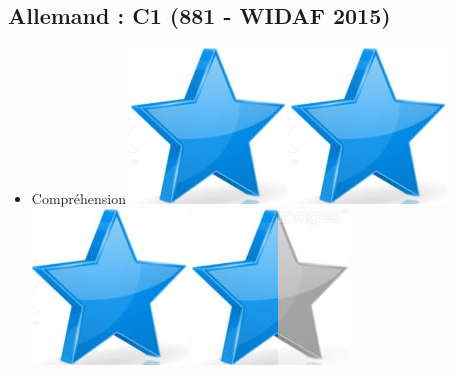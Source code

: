 \documentclass[10pt,a4paper,sans]{article}
\begin{document}
\begin{minipage}[t]{0.28\textwidth}
\begin{mdframed}[style=cadreCompetences]
        \subsection{Allemand : C1 \newline (881 - WIDAF 2015)}
            \begin{itemize}
                \item{Compréhension
                    \hfill
                    \includegraphics[scale=0.25]{img/star.png} \hspace{-0.22cm}
                    \includegraphics[scale=0.25]{img/star.png} \hspace{-0.22cm}
                    \includegraphics[scale=0.25]{img/star.png} \hspace{-0.22cm}
                    \includegraphics[scale=0.25]{img/half_star.png} \hspace{-0.22cm}
}
\end{itemize}
\end{mdframed}
\end{minipage}
\end{document}
